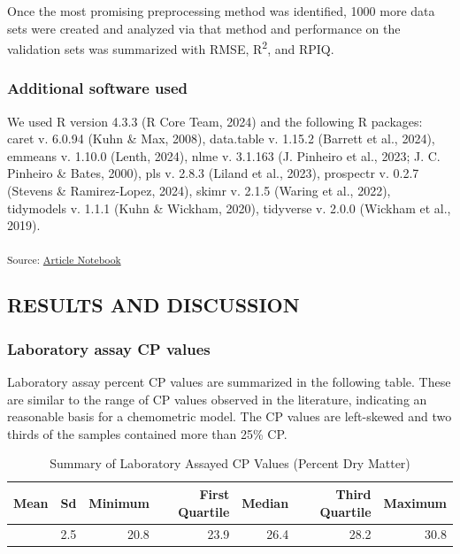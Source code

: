 \documentclass[
]{agujournal2019}
\begin{document}
Once the most promising preprocessing method was identified, 1000 more
data sets were created and analyzed via that method and performance on
the validation sets was summarized with RMSE, R\textsuperscript{2}, and
RPIQ.

\subsubsection{Additional software used}\label{additional-software-used}

We used R version 4.3.3 (R Core Team, 2024) and the following R
packages: caret v. 6.0.94 (Kuhn \& Max, 2008), data.table v. 1.15.2
(Barrett et al., 2024), emmeans v. 1.10.0 (Lenth, 2024), nlme v. 3.1.163
(J. Pinheiro et al., 2023; J. C. Pinheiro \& Bates, 2000), pls v. 2.8.3
(Liland et al., 2023), prospectr v. 0.2.7 (Stevens \& Ramirez-Lopez,
2024), skimr v. 2.1.5 (Waring et al., 2022), tidymodels v. 1.1.1 (Kuhn
\& Wickham, 2020), tidyverse v. 2.0.0 (Wickham et al., 2019).

\textsubscript{Source:
\href{https://rvcrawford.github.io/glowing-system/index.qmd.html}{Article
Notebook}}

\subsection{RESULTS AND DISCUSSION}\label{results-and-discussion}

\subsubsection{Laboratory assay CP
values}\label{laboratory-assay-cp-values}

Laboratory assay percent CP values are summarized in the following
table. These are similar to the range of CP values observed in the
literature, indicating an reasonable basis for a chemometric model. The
CP values are left-skewed and two thirds of the samples contained more
than 25\% CP.

\begin{longtable}[]{@{}rrrrrrr@{}}

\caption{\label{tbl-lab-protein-vals}Summary of Laboratory Assayed CP
Values (Percent Dry Matter)}

\tabularnewline

\toprule\noalign{}
Mean & Sd & Minimum & First Quartile & Median & Third Quartile &
Maximum \\
\midrule\noalign{}
\endhead
\bottomrule\noalign{}
\endlastfoot
26.1 & 2.5 & 20.8 & 23.9 & 26.4 & 28.2 & 30.8 \\

\end{longtable}
\end{document}
